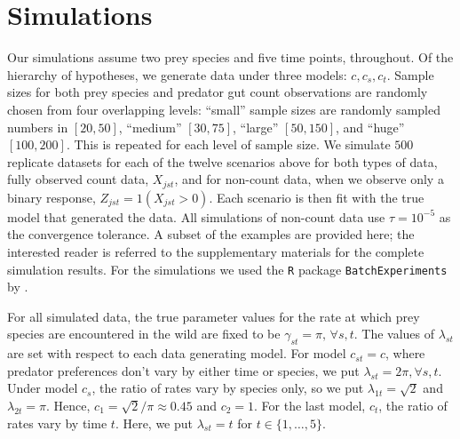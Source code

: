 \section{Simulations}
\label{sec:sim}

Our simulations assume two prey species and five time points, throughout.  Of the hierarchy of hypotheses, we generate data under three models: $c, c_s, c_t$.  Sample sizes for both prey species and predator gut count observations are randomly chosen from four overlapping levels: ``small'' sample sizes are randomly sampled numbers in $[20,50]$, ``medium'' $[30,75]$, ``large'' $[50,150]$, and ``huge'' $[100,200]$.  This is repeated for each level of sample size.  We simulate $500$ replicate datasets for each of the twelve scenarios above for both types of data, fully observed count data, $X_{jst}$, and for non-count data, when we observe only a binary response, $Z_{jst} = 1(X_{jst}>0)$.  Each scenario is then fit with the true model that generated the data.  All simulations of non-count data use $\tau = 10^{-5}$ as the convergence tolerance.  A subset of the examples are provided here; the interested reader is referred to the supplementary materials for the complete simulation results.  For the simulations we used the \texttt{R} \cite{Core-Team:2014} package \texttt{BatchExperiments} by \cite{Bischl:2014}.

For all simulated data, the true parameter values for the rate at which prey species are encountered in the wild are fixed to be $\gamma_{st} = \pi, \, \forall s,t$. The values of $\lambda_{st}$ are set with respect to each data generating model.  For model $c_{st} = c$, where predator preferences don't vary by either time or species, we put $\lambda_{st} = 2\pi, \forall s,t$.  Under model $c_s$, the ratio of rates vary by species only, so we put $\lambda_{1t} = \sqrt{2}$ and $\lambda_{2t} = \pi$.  Hence, $c_1 = \sqrt{2}/\pi \approx 0.45$ and $c_2 = 1$.  For the last model, $c_t$, the ratio of rates vary by time $t$.  Here, we put $\lambda_{st} = t$ for $t \in \{1, \ldots, 5 \}$.  

